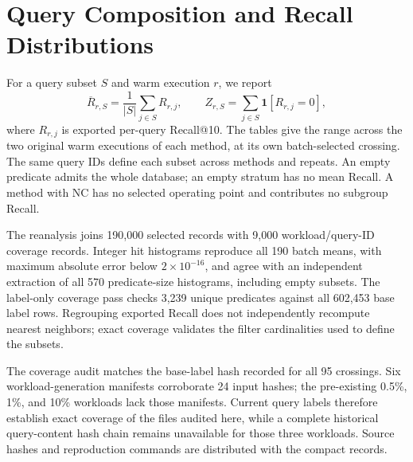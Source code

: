 \section{Query Composition and Recall Distributions}
\label{sec:query-strata}
For a query subset $S$ and warm execution $r$, we report
\[
 \overline{R}_{r,S}=\frac{1}{|S|}\sum_{j\in S} R_{r,j},
 \qquad Z_{r,S}=\sum_{j\in S}\mathbf{1}[R_{r,j}=0],
\]
where $R_{r,j}$ is exported per-query Recall@10. The tables give the range
across the two original warm executions of each method, at its own
batch-selected crossing. The same query IDs define each subset across
methods and repeats. An empty predicate admits the whole database;
an empty stratum has no mean Recall. A method with NC has no selected
operating point and contributes no subgroup Recall.

The reanalysis joins 190,000 selected records with 9,000 workload/query-ID
coverage records. Integer hit histograms reproduce all 190 batch means,
with maximum absolute error below $2\times10^{-16}$, and agree with an
independent extraction of all 570 predicate-size histograms, including
empty subsets. The label-only coverage pass checks 3,239 unique predicates
against all 602,453 base label rows. Regrouping exported Recall does not
independently recompute nearest neighbors; exact coverage validates the
filter cardinalities used to define the subsets.

\querySizeRecallTable
\querySelectivityRecallTable

The coverage audit matches the base-label hash recorded for all 95
crossings. Six workload-generation manifests corroborate 24 input hashes;
the pre-existing 0.5\%, 1\%, and 10\% workloads lack those manifests.
Current query labels therefore establish exact coverage of the files
audited here, while a complete historical query-content hash chain remains
unavailable for those three workloads. Source hashes and reproduction
commands are distributed with the compact records.
